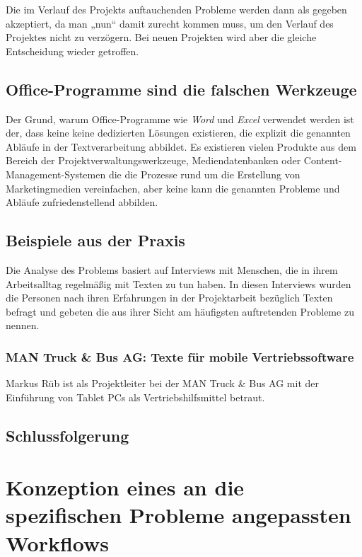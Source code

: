 \documentclass[11pt,a4paper]{article}
\begin{document}
Die im Verlauf des Projekts auftauchenden Probleme werden dann als gegeben akzeptiert, da man „nun“ damit zurecht kommen muss, um den Verlauf des Projektes nicht zu verzögern. Bei neuen Projekten wird aber die gleiche Entscheidung wieder getroffen.

\subsection{Office-Programme sind die falschen Werkzeuge}

Der Grund, warum Office-Programme wie \emph{Word} und \emph{Excel} verwendet werden ist der, dass keine keine dedizierten Lösungen existieren, die explizit die genannten Abläufe in der Textverarbeitung abbildet. Es existieren vielen Produkte aus dem Bereich der Projektverwaltungswerkzeuge, Mediendatenbanken oder Content-Management-Systemen die die Prozesse rund um die Erstellung von Marketingmedien vereinfachen, aber keine kann die genannten Probleme und Abläufe zufriedenstellend abbilden.

\subsection{Beispiele aus der Praxis}

Die Analyse des Problems basiert auf Interviews mit Menschen, die in ihrem Arbeitsalltag regelmäßig mit Texten zu tun haben. In diesen Interviews wurden die Personen nach ihren Erfahrungen in der Projektarbeit bezüglich Texten befragt und gebeten die aus ihrer Sicht am häufigsten auftretenden Probleme zu nennen.

\subsubsection{MAN Truck \& Bus AG: Texte für mobile Vertriebssoftware}

Markus Rüb ist als Projektleiter bei der MAN Truck \& Bus AG mit der Einführung von Tablet PCs als Vertriebshilfsmittel betraut.

\subsection{Schlussfolgerung}

\section{Konzeption eines an die spezifischen Probleme angepassten Workflows}
\end{document}
